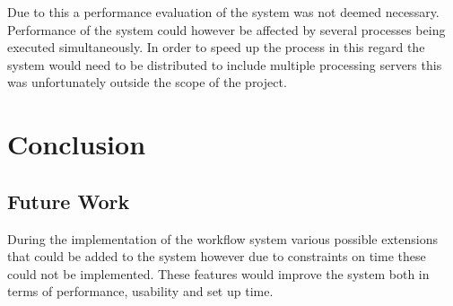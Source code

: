 \documentclass[12pt,a4paper]{report}
\begin{document}
Due to this a performance evaluation of the system was not deemed necessary.
Performance of the system could however be affected by several processes being
executed simultaneously. In order to speed up the process in this regard the
system would need to be distributed to include multiple processing servers this
was unfortunately outside the scope of the project.


\chapter{Conclusion}
\section{Future Work}
During the implementation of the workflow system various possible extensions
that could be added to the system however due to constraints on time these could
not be implemented. These features would improve the system both in terms of
performance, usability and set up time. 
\end{document}
